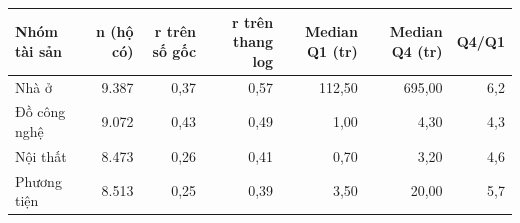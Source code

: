 \begin{tabular}{lrrrrrr}
\toprule
Nhóm tài sản & n (hộ có) & r trên số gốc & r trên thang log & Median Q1 (tr) & Median Q4 (tr) & Q4/Q1 \\
\midrule
Nhà ở & 9.387 & 0,37 & 0,57 & 112,50 & 695,00 & 6,2 \\
Đồ công nghệ & 9.072 & 0,43 & 0,49 & 1,00 & 4,30 & 4,3 \\
Nội thất & 8.473 & 0,26 & 0,41 & 0,70 & 3,20 & 4,6 \\
Phương tiện & 8.513 & 0,25 & 0,39 & 3,50 & 20,00 & 5,7 \\
\bottomrule
\end{tabular}
